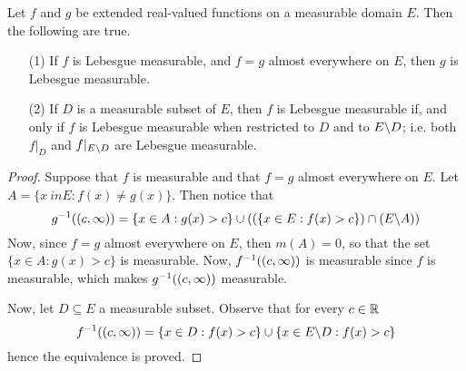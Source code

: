 \begin{lemma}\label{9.1.4}
    Let $f$ and $g$ be extended real-valued functions on a measurable domain $E$.
    Then the following are true.
    \begin{enumerate}
        \item[(1)] If $f$ is Lebesgue measurable, and $f=g$ almost everywhere on
            $E$, then $g$ is Lebesgue measurable.

        \item[(2)] If $D$ is a measurable subset of  $E$, then  $f$ is
            Lebesgue measurable if, and  only if $f$ is Lebesgue measurable when
            restricted to $D$ and to  $E \backslash D$; i.e. both $f|_D$ and
            $f|_{E \backslash D}$ are Lebesgue measurable.
    \end{enumerate}
\end{lemma}
\begin{proof}
    Suppose that $f$ is measurable and that $f=g$ almost everywhere on $E$. Let
    $A=\{x\ in E : f(x) \neq g(x)\}$. Then notice that
    \begin{equation*}
        g^{-1}((c,\infty))=\{x \in A : g(x)>c\} \cup ((\{x \in E : f(x)>c\})
        \cap (E \backslash A))
    \end{equation*}
    Now, since $f=g$ almost everywhere on $E$, then  $m(A)=0$, so that the set
    $\{x \in A : g(x)>c\}$ is measurable. Now, $f^{-1}((c,\infty))$ is
    measurable since $f$ is measurable, which makes  $g^{-1}((c,\infty))$
    measurable.

    Now, let $D \subseteq E$ a measurable subset. Observe that for every  $c \in
    \mathbb{R}$
    \begin{equation*}
        f^{-1}((c,\infty))=\{x \in D : f(x)>c\} \cup \{x \in E \backslash D :
        f(x)>c\}
    \end{equation*}
    hence the equivalence is proved.
\end{proof}

